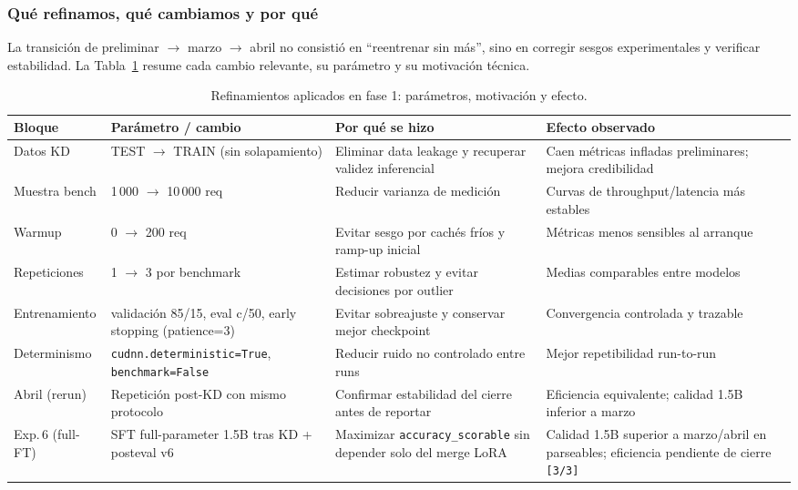 \documentclass[11pt,a4paper]{article}
\begin{document}
\subsubsection*{Qu\'e refinamos, qu\'e cambiamos y por qu\'e}

La transici\'on de preliminar $\to$ marzo $\to$ abril no consisti\'o en
``reentrenar sin m\'as'', sino en corregir sesgos experimentales y
verificar estabilidad. La Tabla~\ref{tab:refinements-why} resume cada
cambio relevante, su par\'ametro y su motivaci\'on t\'ecnica.

\begin{table}[H]
\centering
\caption{Refinamientos aplicados en fase 1: par\'ametros, motivaci\'on y efecto.}
\label{tab:refinements-why}
\begin{adjustbox}{max width=\textwidth}
\begin{tabular}{@{}p{3.1cm}p{3.6cm}p{4.2cm}p{3.1cm}@{}}
\toprule
\textbf{Bloque} & \textbf{Par\'ametro / cambio} & \textbf{Por qu\'e se hizo} & \textbf{Efecto observado} \\
\midrule
Datos KD & TEST $\to$ TRAIN (sin solapamiento) & Eliminar data leakage y recuperar validez inferencial & Caen m\'etricas infladas preliminares; mejora credibilidad \\
Muestra bench & 1\,000 $\to$ 10\,000 req & Reducir varianza de medici\'on & Curvas de throughput/latencia m\'as estables \\
Warmup & 0 $\to$ 200 req & Evitar sesgo por cach\'es fr\'ios y ramp-up inicial & M\'etricas menos sensibles al arranque \\
Repeticiones & 1 $\to$ 3 por benchmark & Estimar robustez y evitar decisiones por outlier & Medias comparables entre modelos \\
Entrenamiento & validaci\'on 85/15, eval c/50, early stopping (patience=3) & Evitar sobreajuste y conservar mejor checkpoint & Convergencia controlada y trazable \\
Determinismo & \texttt{cudnn.deterministic=True}, \texttt{benchmark=False} & Reducir ruido no controlado entre runs & Mejor repetibilidad run-to-run \\
Abril (rerun) & Repetici\'on post-KD con mismo protocolo & Confirmar estabilidad del cierre antes de reportar & Eficiencia equivalente; calidad 1.5B inferior a marzo \\
Exp.\,6 (full-FT) & SFT full-parameter 1.5B tras KD + posteval v6 & Maximizar \texttt{accuracy\_scorable} sin depender solo del merge LoRA & Calidad 1.5B superior a marzo/abril en parseables; eficiencia pendiente de cierre \texttt{[3/3]} \\
\bottomrule
\end{tabular}
\end{adjustbox}
\end{table}
\end{document}
